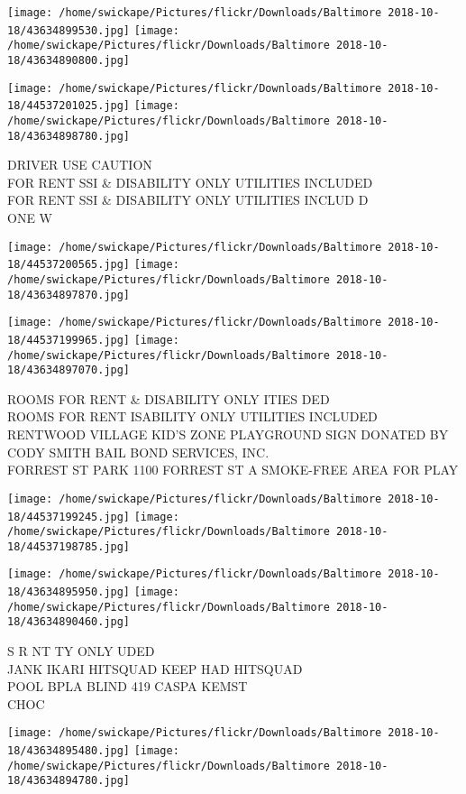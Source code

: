 \documentclass[10pt,letterpaper]{article}
\begin{document}
\texttt{[image: /home/swickape/Pictures/flickr/Downloads/Baltimore 2018-10-18/43634899530.jpg]}
\texttt{[image: /home/swickape/Pictures/flickr/Downloads/Baltimore 2018-10-18/43634890800.jpg]}

\texttt{[image: /home/swickape/Pictures/flickr/Downloads/Baltimore 2018-10-18/44537201025.jpg]}
\texttt{[image: /home/swickape/Pictures/flickr/Downloads/Baltimore 2018-10-18/43634898780.jpg]}

DRIVER USE CAUTION\\
FOR RENT SSI \& DISABILITY ONLY UTILITIES INCLUDED\\
FOR RENT SSI \& DISABILITY ONLY UTILITIES INCLUD D\\
ONE W
\pagebreak

\texttt{[image: /home/swickape/Pictures/flickr/Downloads/Baltimore 2018-10-18/44537200565.jpg]}
\texttt{[image: /home/swickape/Pictures/flickr/Downloads/Baltimore 2018-10-18/43634897870.jpg]}

\texttt{[image: /home/swickape/Pictures/flickr/Downloads/Baltimore 2018-10-18/44537199965.jpg]}
\texttt{[image: /home/swickape/Pictures/flickr/Downloads/Baltimore 2018-10-18/43634897070.jpg]}

ROOMS FOR RENT \& DISABILITY ONLY ITIES DED\\
ROOMS FOR RENT ISABILITY ONLY UTILITIES INCLUDED\\
RENTWOOD VILLAGE KID'S ZONE PLAYGROUND SIGN DONATED BY CODY SMITH BAIL BOND SERVICES, INC.\\
FORREST ST PARK 1100 FORREST ST A SMOKE{-}FREE AREA FOR PLAY
\pagebreak

\texttt{[image: /home/swickape/Pictures/flickr/Downloads/Baltimore 2018-10-18/44537199245.jpg]}
\texttt{[image: /home/swickape/Pictures/flickr/Downloads/Baltimore 2018-10-18/44537198785.jpg]}

\texttt{[image: /home/swickape/Pictures/flickr/Downloads/Baltimore 2018-10-18/43634895950.jpg]}
\texttt{[image: /home/swickape/Pictures/flickr/Downloads/Baltimore 2018-10-18/43634890460.jpg]}

S R NT TY ONLY UDED\\
JANK IKARI HITSQUAD KEEP HAD HITSQUAD\\
POOL BPLA BLIND 419 CASPA KEMST\\
CHOC
\pagebreak

\texttt{[image: /home/swickape/Pictures/flickr/Downloads/Baltimore 2018-10-18/43634895480.jpg]}
\texttt{[image: /home/swickape/Pictures/flickr/Downloads/Baltimore 2018-10-18/43634894780.jpg]}
\end{document}
